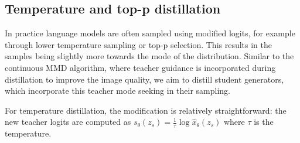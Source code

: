 


\subsection{Temperature and top-p distillation}
In practice language models are often sampled using modified logits, for example through lower temperature sampling or top-p selection. This results in the samples being slightly more towards the mode of the distribution.
Similar to the continuous MMD algorithm, where teacher guidance is incorporated during distillation to improve the image quality, we aim to distill student generators, which incorporate this teacher mode seeking in their sampling.

For temperature distillation, the modification is relatively straightforward: the new teacher logits are computed as $s_\theta(z_s) = \tfrac{1}{\tau} \log \hat{x}_{\theta}(z_s)$ where $\tau$ is the temperature.

